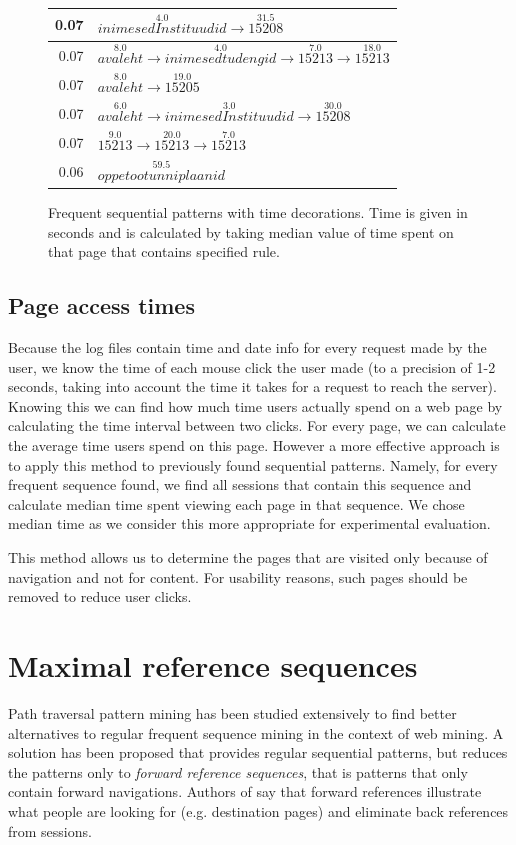 \documentclass[12pt, english,a4paper]{article}
\begin{document}
\begin{figure}[H]
\begin{tabular}{ r | l }
0.07 & $ \overset{4.0}{inimesedInstituudid} \rightarrow \overset{31.5}{15208} $ \\ \hline
0.07 & $ \overset{8.0}{avaleht} \rightarrow \overset{4.0}{inimesedtudengid} \rightarrow \overset{7.0}{15213} \rightarrow \overset{18.0}{15213} $ \\ \hline
0.07 & $ \overset{8.0}{avaleht} \rightarrow \overset{19.0}{15205} $ \\ \hline
0.07 & $ \overset{6.0}{avaleht} \rightarrow \overset{3.0}{inimesedInstituudid} \rightarrow \overset{30.0}{15208} $ \\ \hline
0.07 & $ \overset{9.0}{15213} \rightarrow \overset{20.0}{15213} \rightarrow \overset{7.0}{15213} $ \\ \hline
0.06 & $ \overset{59.5}{oppetootunniplaanid} $ \\ \hline
\end{tabular}
  \caption{Frequent sequential patterns with time decorations. Time is given in seconds and is calculated by taking median value of time spent on that page that contains specified rule. }
  \label{frequent_patterns}
\end{figure}


\subsection{Page access times}
Because the log files contain time and date info for every request made by the user, we know the time of each mouse click the user made (to a precision of 1-2 seconds, taking into account the time it takes for a request to reach the server). Knowing this we can find how much time users actually spend on a web page by calculating the time interval between two clicks. For every page, we can calculate the average time users spend on this page. However a more effective approach is to apply this method to previously found sequential patterns. Namely, for every frequent sequence found, we find all sessions that contain this sequence and calculate median time spent viewing each page in that sequence. We chose median time as we consider this more appropriate for experimental evaluation.

This method allows us to determine the pages that are visited only because of navigation and not for content. For usability reasons, such pages should be removed to reduce user clicks.





\section{Maximal reference sequences}
Path traversal pattern mining has been studied extensively to find better alternatives to regular frequent sequence mining in the context of web mining. A solution has been proposed \cite{path_patterns} that provides regular sequential patterns, but reduces the patterns only to \emph{forward reference sequences}, that is patterns that only contain forward navigations. Authors of \cite{path_patterns} say that forward references illustrate what people are looking for (e.g. destination pages) and eliminate back references from sessions.
\end{document}
